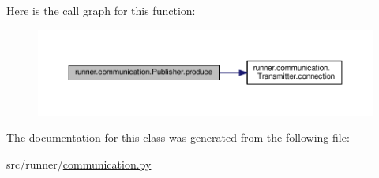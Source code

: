 Here is the call graph for this function\+:
\nopagebreak
\begin{figure}[H]
\begin{center}
\leavevmode
\includegraphics[width=350pt]{classrunner_1_1communication_1_1Publisher_a5428c27894232f2e285b85ee32f03860_cgraph}
\end{center}
\end{figure}




The documentation for this class was generated from the following file\+:\begin{DoxyCompactItemize}
\item 
src/runner/\hyperlink{communication_8py}{communication.\+py}\end{DoxyCompactItemize}
